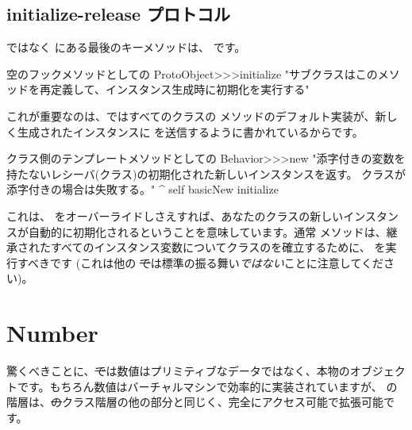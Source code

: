 \documentclass[a4paper,10pt,twoside]{book}
\begin{document}

\subsection{initialize-release プロトコル}

 ではなく  にある最後のキーメソッドは、 です。

\begin{method}{空のフックメソッドとしての }
ProtoObject>>>initialize
   "サブクラスはこのメソッドを再定義して、インスタンス生成時に初期化を実行する"
\end{method}

これが重要なのは、\pharo ではすべてのクラスの  メソッドのデフォルト実装が、新しく生成されたインスタンスに  を送信するように書かれているからです。

\begin{method}{クラス側のテンプレートメソッドとしての }
Behavior>>>new
    "添字付きの変数を持たないレシーバ(クラス)の初期化された新しいインスタンスを返す。
    クラスが添字付きの場合は失敗する。"
    ^ self basicNew initialize
\end{method} %

これは、 をオーバーライドしさえすれば、あなたのクラスの新しいインスタンスが自動的に初期化されるということを意味しています。通常  メソッドは、継承されたすべてのインスタンス変数についてクラスのを確立するために、 を実行すべきです
(これは他の \st では標準の振る舞い\emph{ではない}ことに注意してください)。%

\section{Number}
驚くべきことに、\st では数値はプリミティブなデータではなく、本物のオブジェクトです。もちろん数値はバーチャルマシンで効率的に実装されていますが、 の階層は、\st のクラス階層の他の部分と同じく、完全にアクセス可能で拡張可能です。
\end{document}
